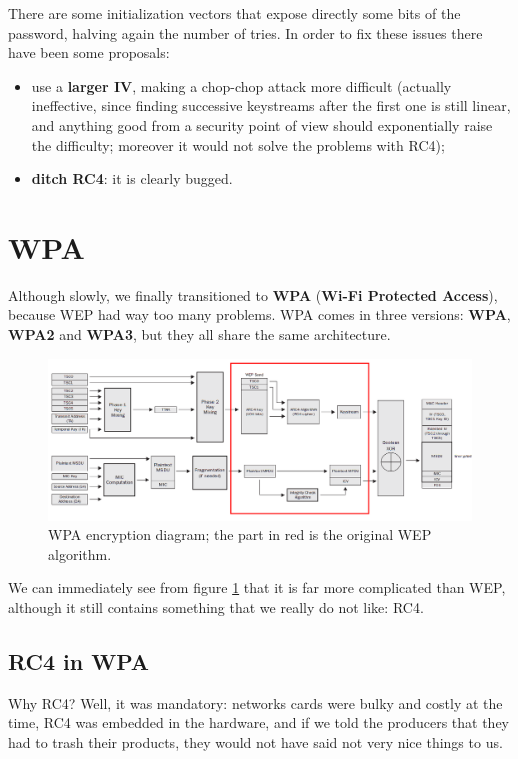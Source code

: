 There are some initialization vectors that expose directly some bits of the password, halving again the number of tries. In order to fix these issues there have been some proposals:

\begin{itemize}
	\item use a \textbf{larger IV}, making a chop-chop attack more difficult (actually ineffective, since finding successive keystreams after the first one is still linear, and anything good from a security point of view should exponentially raise the difficulty; moreover it would not solve the problems with RC4);
	\item \textbf{ditch RC4}: it is clearly bugged.
\end{itemize}


\section{WPA}
Although slowly, we finally transitioned to \textbf{WPA} (\textbf{Wi-Fi Protected Access}), because WEP had way too many problems. WPA comes in three versions: \textbf{WPA}, \textbf{WPA2} and \textbf{WPA3}, but they all share the same architecture.

\begin{figure}[h]
    \centering
    \includegraphics[scale=0.5]{img/wpa_encryption.png}
    \decoRule
    \caption{WPA encryption diagram; the part in red is the original WEP algorithm.}
    \label{fig:wpa_encryption}
\end{figure}

We can immediately see from figure \ref{fig:wpa_encryption} that it is far more complicated than WEP, although it still contains something that we really do not like: RC4.


\subsection{RC4 in WPA}
Why RC4? Well, it was mandatory: networks cards were bulky and costly at the time, RC4 was embedded in the hardware, and if we told the producers that they had to trash their products, they would not have said not very nice things to us.

